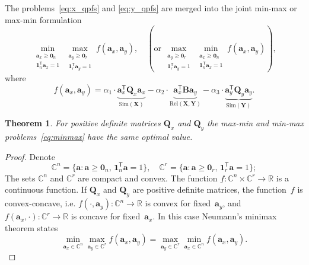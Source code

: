 \documentclass[12pt,twoside]{article}
\newtheorem{theorem}{Theorem}
\theoremstyle{definition}
\newcommand{\ba}{\mathbf{a}}
\newcommand{\bY}{\mathbf{Y}}
\newcommand{\bX}{\mathbf{X}}
\newcommand{\bB}{\mathbf{B}}
\newcommand{\bQ}{\mathbf{Q}}
\newcommand{\bbR}{\mathbb{R}}
\newcommand{\T}{\mathsf{T}}
\newcommand{\bOne}{\boldsymbol{1}}
\newcommand{\bZero}{\boldsymbol{0}}
\begin{document}
The problems~\eqref{eq:x_qpfs} and \eqref{eq:y_qpfs} are merged into the joint min-max or max-min formulation
\begin{equation}
	\min_{\substack{\ba_x \geq \bZero_n \\ \bOne_n^{\T}\ba_x=1}} 	\max_{\substack{\ba_y \geq \bZero_r \\ \bOne_r^{\T}\ba_y=1}} f(\ba_x, \ba_y), \quad \left(\text {or} \, \max_{\substack{\ba_y \geq \bZero_r \\ \bOne_r^{\T}\ba_y=1}} \min_{\substack{\ba_x \geq \bZero_n \\ \bOne_n^{\T}\ba_x=1}} f(\ba_x, \ba_y)\right),
	\label{eq:minmax}
\end{equation}
where
\[
	f(\ba_x, \ba_y) = \alpha_1 \cdot \underbrace{\ba_x^{\T} \bQ_x \ba_x}_{\text{Sim}(\bX)} - \alpha_2 \cdot \underbrace{\ba_x^{\T} \bB \ba_y}_{\text{Rel}(\bX, \bY)} - \alpha_3 \cdot \underbrace{\ba_y^{\T} \bQ_y \ba_y}_{\text{Sim}(\bY)}.
\]
\begin{theorem}
	For positive definite matrices $\bQ_x$ and $\bQ_y$ the max-min and min-max problems~\eqref{eq:minmax} have the same optimal value.
\end{theorem}
\begin{proof}
	Denote
	\begin{equation*}
	\mathbb{C}^n = \{\ba : \ba \geq \bZero_n, \, \bOne_n^{\T}\ba=1\}, \quad \mathbb{C}^r = \{\ba : \ba \geq \bZero_r, \, \bOne_r^{\T}\ba=1\};
	\end{equation*}
	The sets $\mathbb{C}^n$ and $\mathbb{C}^r$ are compact and convex. The function $f: \mathbb{C}^n \times \mathbb{C}^r \rightarrow \bbR$ is a continuous function. If $\bQ_x$ and $\bQ_y$ are positive definite matrices, the function~$f$ is convex-concave, i.e.
	$f(\cdot, \ba_y): \mathbb{C}^n \rightarrow \bbR$ is convex for fixed~$\ba_y$, and $f(\ba_x, \cdot): \mathbb{C}^r \rightarrow \bbR$ is concave for fixed~$\ba_x$.
	In this case Neumann's minimax theorem states
	\[
	\min_{\ba_x \in \mathbb{C}^n} \max_{\ba_y \in \mathbb{C}^r} f(\ba_x, \ba_y) = \max_{\ba_y \in \mathbb{C}^r} \min_{\ba_x\in \mathbb{C}^n} f(\ba_x, \ba_y).
	\]
\end{proof}
\end{document}
